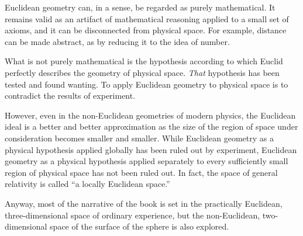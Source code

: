 Euclidean geometry can, in a sense, be regarded as purely mathematical.  It
remains valid as an artifact of mathematical reasoning applied to a small set
of axioms, and it can be disconnected from physical space.  For example,
distance can be made abstract, as by reducing it to the idea of number.

What is not purely mathematical is the hypothesis according to which Euclid
perfectly describes the geometry of physical space.  \emph{That} hypothesis has
been tested and found wanting.  To apply Euclidean geometry to physical space
is to contradict the results of experiment.

However, even in the non-Euclidean geometries of modern physics, the Euclidean
ideal is a better and better approximation as the size of the region of space
under consideration becomes smaller and smaller.  While Euclidean geometry as a
physical hypothesis applied globally has been ruled out by experiment,
Euclidean geometry as a physical hypothesis applied separately to every
sufficiently small region of physical space has not been ruled out.  In fact,
the space of general relativity is called ``a locally Euclidean space.''

Anyway, most of the narrative of the book is set in the practically Euclidean,
three-dimensional space of ordinary experience, but the non-Euclidean,
two-dimensional space of the surface of the sphere is also explored.

